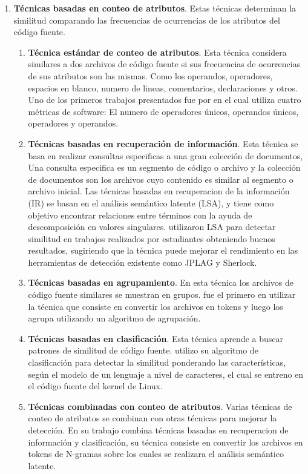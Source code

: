 \begin{enumerate}
    \item \textbf{Técnicas basadas en conteo de atributos}. Estas técnicas determinan la similitud comparando las frecuencias de ocurrencias de los atributos del código fuente.
    \begin{enumerate}
      \item \textbf{Técnica estándar de conteo de atributos}. Esta técnica considera similares a dos archivos de código fuente si sus frecuencias de ocurrencias de sus atributos son las mismas. Como los operandos, operadores, espacios en blanco, numero de lineas, comentarios, declaraciones y otros. Uno de los primeros trabajos presentados fue por \cite{Ottenstein1976} en el cual utiliza cuatro métricas de software: El numero de operadores únicos, operandos únicos, operadores y operandos.
      \item \textbf{Técnicas basadas en recuperación de información}. Esta técnica se basa en realizar consultas especificas a una gran colección de documentos, Una consulta especifica es un segmento de código o archivo y la colección de documentos son los archivos cuyo contenido es similar al segmento o archivo inicial. Las técnicas basadas en recuperacion de la información (IR) se basan en el análisis semántico latente (LSA), y tiene como objetivo encontrar relaciones entre términos con la ayuda de descomposición en valores singulares. \cite{Cosma2012} utilizaron LSA para detectar similitud en trabajos realizados por estudiantes obteniendo buenos resultados, sugiriendo que la técnica puede mejorar el rendimiento en las herramientas de detección existente como JPLAG y Sherlock.
      \item \textbf{Técnicas basadas en agrupamiento}. En esta técnica los archivos de código fuente similares se muestran en grupos. \cite{Moussiades2005} fue el primero en utilizar la técnica que consiste en convertir los archivos en tokens y luego los agrupa utilizando un algoritmo de agrupación.
      \item \textbf{Técnicas basadas en clasificación}. Esta técnica aprende a buscar patrones de similitud de código fuente. \cite{Yasaswi2017} utilizo su algoritmo de clasificación para detectar la similitud ponderando las características, según el modelo de un lenguaje a nivel de caracteres, el cual se entreno en el código fuente del kernel de Linux.
      \item \textbf{Técnicas combinadas con conteo de atributos}. Varias técnicas de conteo de atributos se combinan con otras técnicas para mejorar la detección. En su trabajo \cite{Sidorov2017} combina técnicas basadas en recuperacion de información y clasificación, su técnica consiste en convertir los archivos en tokens de N-gramas sobre los cuales se realizara el análisis semántico latente.

\end{enumerate}
\end{enumerate}
